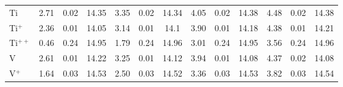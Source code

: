 \begin{longtable}{l!{\vrule width 0.25pt}ccc!{\vrule width 0.25pt}ccc!{\vrule width 0.25pt}ccc!{\vrule width 0.25pt}ccc}
Ti & 2.71 & 0.02 & 14.35 & 3.35 & 0.02 & 14.34 & 4.05 & 0.02 & 14.38 & 4.48 & 0.02 & 14.38 \\
Ti$^+$ & 2.36 & 0.01 & 14.05 & 3.14 & 0.01 & 14.1 & 3.90 & 0.01 & 14.18 & 4.38 & 0.01 & 14.21 \\
Ti$^{++}$ & 0.46 & 0.24 & 14.95 & 1.79 & 0.24 & 14.96 & 3.01 & 0.24 & 14.95 & 3.56 & 0.24 & 14.96 \\
V & 2.61 & 0.01 & 14.22 & 3.25 & 0.01 & 14.12 & 3.94 & 0.01 & 14.08 & 4.37 & 0.02 & 14.08 \\
V$^+$ & 1.64 & 0.03 & 14.53 & 2.50 & 0.03 & 14.52 & 3.36 & 0.03 & 14.53 & 3.82 & 0.03 & 14.54 \\
\end{longtable}
